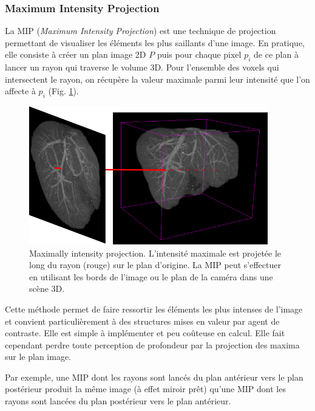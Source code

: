       \subsubsection{Maximum Intensity Projection}

      La MIP (\textit{Maximum Intensity Projection}) est une technique de projection permettant de visualiser les éléments les plus saillants d'une image. En pratique, elle consiste à créer un plan image 2D $P$ puis pour chaque pixel $p_i$ de ce plan à lancer un rayon qui traverse le volume 3D. Pour l'ensemble des voxels qui intersectent le rayon, on récupère la valeur maximale parmi leur intensité que l'on affecte à $p_i$ (Fig. \ref{fig:MIP_visualisation}). 

      \begin{figure}[h]
        \centering
        \includegraphics[height=6cm]{Images/3D_mip_ray.png}
        \caption{Maximally intensity projection. L'intensité maximale est projetée le long du rayon (rouge) sur le plan d'origine. La MIP peut s'effectuer en utilisant les bords de l'image  ou le plan de la caméra dans une scène 3D.}
        \label{fig:MIP_visualisation}
      \end{figure}

      Cette méthode permet de faire ressortir les éléments les plus intenses de l'image et convient particulièrement à des structures mises en valeur par agent de contraste. Elle est simple à implémenter et peu coûteuse en calcul. Elle fait cependant perdre toute perception de profondeur par la projection des maxima sur le plan image. 
      
      Par exemple, une MIP dont les rayons sont lancés du plan antérieur vers le plan postérieur produit la même image (à effet miroir prêt) qu'une MIP dont les rayons sont lancées du plan postérieur vers le plan antérieur.

